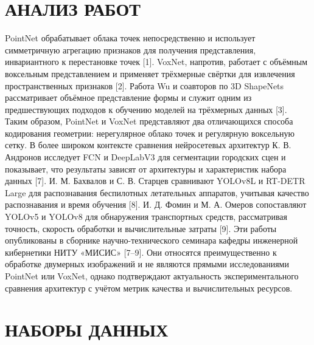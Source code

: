 \documentclass{misisarticle}
\begin{document}
\section{АНАЛИЗ РАБОТ}
PointNet обрабатывает облака точек непосредственно и использует симметричную агрегацию признаков для получения представления, инвариантного к перестановке точек [1]. VoxNet, напротив, работает с объёмным воксельным представлением и применяет трёхмерные свёртки для извлечения пространственных признаков [2]. Работа Wu и соавторов по 3D ShapeNets рассматривает объёмное представление формы и служит одним из предшествующих подходов к обучению моделей на трёхмерных данных [3]. Таким образом, PointNet и VoxNet представляют два отличающихся способа кодирования геометрии: нерегулярное облако точек и регулярную воксельную сетку. В более широком контексте сравнения нейросетевых архитектур К. В. Андронов исследует FCN и DeepLabV3 для сегментации городских сцен и показывает, что результаты зависят от архитектуры и характеристик набора данных [7]. И. М. Бахвалов и С. В. Старцев сравнивают YOLOv8L и RT-DETR Large для распознавания беспилотных летательных аппаратов, учитывая качество распознавания и время обучения [8]. И. Д. Фомин и М. А. Омеров сопоставляют YOLOv5 и YOLOv8 для обнаружения транспортных средств, рассматривая точность, скорость обработки и вычислительные затраты [9]. Эти работы опубликованы в сборнике научно-технического семинара кафедры инженерной кибернетики НИТУ «МИСИС» [7–9]. Они относятся преимущественно к обработке двумерных изображений и не являются прямыми исследованиями PointNet или VoxNet, однако подтверждают актуальность экспериментального сравнения архитектур с учётом метрик качества и вычислительных ресурсов.\par
\section{НАБОРЫ ДАННЫХ}
\end{document}
